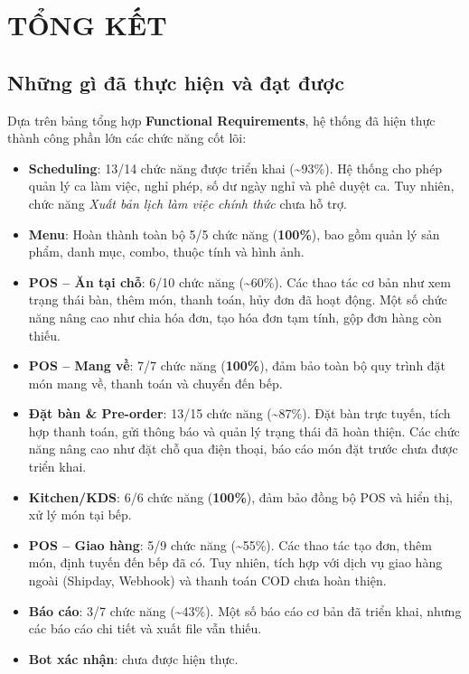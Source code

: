 \section{TỔNG KẾT}

\subsection{Những gì đã thực hiện và đạt được}

Dựa trên bảng tổng hợp \textbf{Functional Requirements}, hệ thống đã hiện thực thành công phần lớn các chức năng cốt lõi:

\begin{itemize}
    \item \textbf{Scheduling}: 13/14 chức năng được triển khai (\textasciitilde 93\%). Hệ thống cho phép quản lý ca làm việc, nghỉ phép, số dư ngày nghỉ và phê duyệt ca. Tuy nhiên, chức năng \textit{Xuất bản lịch làm việc chính thức} chưa hỗ trợ.
    \item \textbf{Menu}: Hoàn thành toàn bộ 5/5 chức năng (\textbf{100\%}), bao gồm quản lý sản phẩm, danh mục, combo, thuộc tính và hình ảnh.
    \item \textbf{POS – Ăn tại chỗ}: 6/10 chức năng (\textasciitilde 60\%). Các thao tác cơ bản như xem trạng thái bàn, thêm món, thanh toán, hủy đơn đã hoạt động. Một số chức năng nâng cao như chia hóa đơn, tạo hóa đơn tạm tính, gộp đơn hàng còn thiếu.
    \item \textbf{POS – Mang về}: 7/7 chức năng (\textbf{100\%}), đảm bảo toàn bộ quy trình đặt món mang về, thanh toán và chuyển đến bếp.
    \item \textbf{Đặt bàn \& Pre-order}: 13/15 chức năng (\textasciitilde 87\%). Đặt bàn trực tuyến, tích hợp thanh toán, gửi thông báo và quản lý trạng thái đã hoàn thiện. Các chức năng nâng cao như đặt chỗ qua điện thoại, báo cáo món đặt trước chưa được triển khai.
    \item \textbf{Kitchen/KDS}: 6/6 chức năng (\textbf{100\%}), đảm bảo đồng bộ POS và hiển thị, xử lý món tại bếp.
    \item \textbf{POS – Giao hàng}: 5/9 chức năng (\textasciitilde 55\%). Các thao tác tạo đơn, thêm món, định tuyến đến bếp đã có. Tuy nhiên, tích hợp với dịch vụ giao hàng ngoài (Shipday, Webhook) và thanh toán COD chưa hoàn thiện.
    \item \textbf{Báo cáo}: 3/7 chức năng (\textasciitilde 43\%). Một số báo cáo cơ bản đã triển khai, nhưng các báo cáo chi tiết và xuất file vẫn thiếu.
    \item \textbf{Bot xác nhận}: chưa được hiện thực.
\end{itemize}

